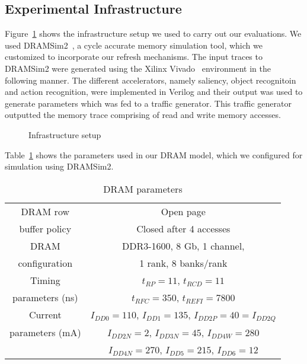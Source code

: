 \subsection{Experimental Infrastructure}
Figure~\ref{fig:experimental-setup} shows the infrastructure setup we used to carry out our evaluations.
We used DRAMSim2~\cite{DRAMsim2}, a cycle accurate memory simulation tool, which we customized to incorporate our refresh mechanisms. 
The input traces to DRAMSim2 were generated using the Xilinx Vivado~\cite{vivado} environment in the following manner.
The different accelerators, namely saliency, object recognitoin and action recognition, were implemented in Verilog and their output was used to generate parameters which was fed to a traffic generator.
This traffic generator outputted the memory trace comprising of read and write memory accesses.

\begin{figure}[ht!]
\centering
{}
\caption{\label{fig:experimental-setup} Infrastructure setup}
\end{figure}

Table~\ref{tab:dram-parameters} shows the parameters used in our DRAM model, which we configured for simulation using DRAMSim2.


\begin{table}[ht!]
\footnotesize
\centering
\begin{tabular}{|c|c|} \hline
DRAM row & Open page\\
buffer policy & Closed after 4 accesses\\\hline
DRAM & DDR3-1600, 8 Gb, 1 channel,\\
configuration &  1 rank, 8 banks/rank \\\hline
Timing & $t_{RP}=11$, $t_{RCD}=11$\\
parameters (ns) & $t_{RFC}=350$, $t_{REFI}=7800$ \\\hline
Current & $I_{DD0}=110$, $I_{DD1}=135$, $I_{DD2P}=40=I_{DD2Q}$ \\ 
parameters (mA) & $I_{DD2N}=2$, $I_{DD3N}=45$, $I_{DD4W}=280$ \\ 
&$I_{DD4N}=270$, $I_{DD5}=215$, $I_{DD6}=12$ \\\hline
\end{tabular}
\vspace{0.1in}
\caption {DRAM parameters}
\label{tab:dram-parameters}
\end{table}

